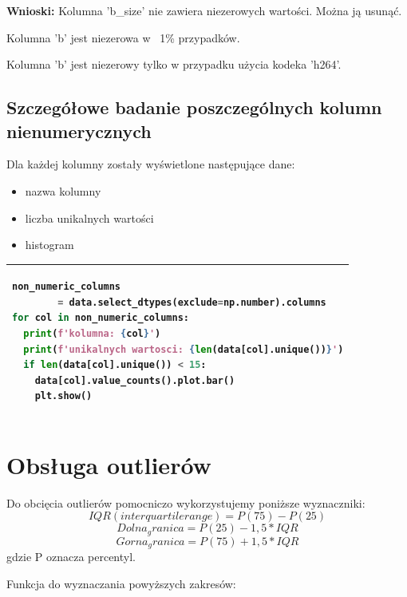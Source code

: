 \documentclass[11pt, a4paper]{article}
\begin{document}
    \textbf{Wnioski:}
    Kolumna 'b\_size' nie zawiera niezerowych wartości. Można ją usunąć. \par
    Kolumna 'b' jest niezerowa w ~1\% przypadków.\par
    Kolumna 'b' jest niezerowy tylko w przypadku użycia kodeka 'h264'.\par
    

    \subsection{Szczegółowe badanie poszczególnych kolumn nienumerycznych}
    
    Dla każdej kolumny zostały wyświetlone następujące dane:\par
    \begin{itemize}
        \item nazwa kolumny
        \item liczba unikalnych wartości
        \item histogram
    \end{itemize}

    \begin{tabular}{|l|}
        \hline
        \begin{lstlisting}[language=Python]
non_numeric_columns 
        = data.select_dtypes(exclude=np.number).columns
for col in non_numeric_columns:
  print(f'kolumna: {col}')
  print(f'unikalnych wartosci: {len(data[col].unique())}')
  if len(data[col].unique()) < 15:
    data[col].value_counts().plot.bar()
    plt.show()
        \end{lstlisting}
        \\ \hline
    \end{tabular}
    
   \newpage 
    \section{Obsługa outlierów}
    
    Do obcięcia outlierów pomocniczo wykorzystujemy poniższe wyznaczniki:
    \begin{equation}
        IQR (interquartile range) = P(75) - P(25) 
    \end{equation} 
    \begin{equation}
        Dolna_granica = P(25) - 1,5*IQR
    \end{equation} 
    \begin{equation}
        Gorna_granica = P(75) + 1,5*IQR
    \end{equation} 
    gdzie P oznacza percentyl. \par
    \vspace{0.5cm}
    Funkcja do wyznaczania powyższych zakresów: \par
    \vspace{0.5cm} 
    
\end{document}
